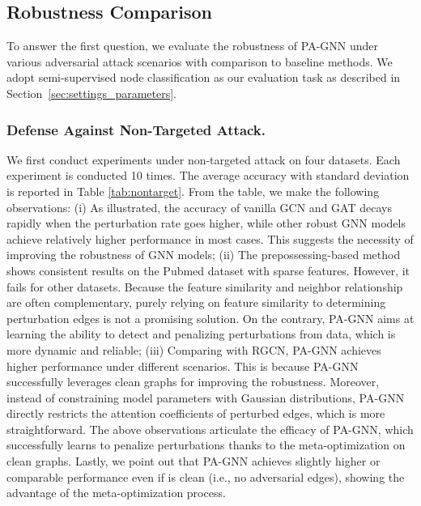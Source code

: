 \documentclass[sigconf]{acmart}
\newcommand{\our}{{PA-GNN}\xspace}
\newcommand{\ours}{{PA-GNN}\xspace}
\begin{document}
\subsection{Robustness Comparison}


To answer the first question, we evaluate the robustness of \our  under various adversarial attack scenarios with comparison to baseline methods. We adopt semi-supervised node classification as our evaluation task as described in Section~\ref{sec:settings_parameters}.

\subsubsection{Defense Against Non-Targeted Attack.}
We first conduct experiments under non-targeted attack on four datasets. Each experiment is conducted 10 times. The average accuracy with standard deviation is reported in Table \ref{tab:nontarget}. From the table, we make the following observations: (i) As illustrated, the accuracy of vanilla GCN and GAT decays rapidly when the perturbation rate goes higher, while other robust GNN models achieve relatively higher performance in most cases. This suggests the necessity of improving the robustness of GNN models; (ii) The prepossessing-based method shows consistent results on the Pubmed dataset with sparse features. However, it fails for other datasets. Because the feature similarity and neighbor relationship are often complementary, purely relying on feature similarity to determining perturbation edges is not a promising solution. On the contrary, \our aims at learning the ability to detect and penalizing perturbations from data, which is more dynamic and reliable;
(iii) Comparing with RGCN, \our achieves higher performance under different scenarios. This is because \our successfully leverages clean graphs for improving the robustness. Moreover, instead of constraining model parameters with Gaussian distributions, \our directly restricts the attention coefficients of perturbed edges, which is more straightforward. The above observations articulate the efficacy of \ours, which successfully learns to penalize perturbations thanks to the meta-optimization on clean graphs. Lastly, we point out that \ours achieves slightly higher or comparable performance even if  is clean (i.e., no adversarial edges), showing the advantage of the meta-optimization process.
\end{document}
